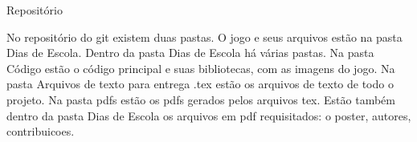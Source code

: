 \documentclass{article}
\begin{document}
\Huge{Repositório}

\normalsize{No repositório do git existem duas pastas. O jogo e seus arquivos estão na pasta Dias de Escola.
Dentro da pasta Dias de Escola há várias pastas.
Na pasta Código estão o código principal e suas bibliotecas, com as imagens do jogo.
Na pasta Arquivos de texto para entrega .tex estão os arquivos de texto de todo o projeto.
Na pasta pdfs estão os pdfs gerados pelos arquivos tex.
Estão também dentro da pasta Dias de Escola os arquivos em pdf requisitados: o poster, autores, contribuicoes.
}
\end{document}
